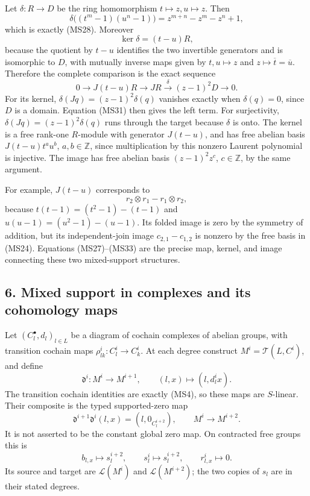 \documentclass[
]{article}
\begin{document}
Let \(\delta:R\to D\) be the ring homomorphism
\(t\mapsto z,u\mapsto z\). Then \[
\delta\bigl((t^m-1)(u^n-1)\bigr)
=z^{m+n}-z^m-z^n+1,
\] which is exactly (MS28). Moreover \[
\ker\delta=(t-u)R,
\tag{MS31}
\] because the quotient by \(t-u\) identifies the two invertible
generators and is isomorphic to \(D\), with mutually inverse maps given
by \(t,u\mapsto z\) and \(z\mapsto\overline t=\overline u\). Therefore
the complete comparison is the exact sequence \[
0\longrightarrow J(t-u)R
\longrightarrow JR
\xrightarrow{\ \delta\ }(z-1)^2D
\longrightarrow0.
\tag{MS32}
\] For its kernel, \(\delta(Jq)=(z-1)^2\delta(q)\) vanishes exactly when
\(\delta(q)=0\), since \(D\) is a domain. Equation (MS31) then gives the
left term. For surjectivity, \(\delta(Jq)=(z-1)^2\delta(q)\) runs
through the target because \(\delta\) is onto. The kernel is a free
rank-one \(R\)-module with generator \(J(t-u)\), and has free abelian
basis \(J(t-u)t^a u^b\), \(a,b\in\mathbb Z\), since multiplication by
this nonzero Laurent polynomial is injective. The image has free abelian
basis \((z-1)^2z^c\), \(c\in\mathbb Z\), by the same argument.

For example, \(J(t-u)\) corresponds to \[
r_2\otimes r_1-r_1\otimes r_2,
\tag{MS33}
\] because \(t(t-1)=(t^2-1)-(t-1)\) and \(u(u-1)=(u^2-1)-(u-1)\). Its
folded image is zero by the symmetry of addition, but its
independent-join image \(c_{2,1}-c_{1,2}\) is nonzero by the free basis
in (MS24). Equations (MS27)--(MS33) are the precise map, kernel, and
image connecting these two mixed-support structures.

\subsection{6. Mixed support in complexes and its cohomology
maps}\label{mixed-support-in-complexes-and-its-cohomology-maps}

Let \((C_l^\bullet,d_l)_{l\in L}\) be a diagram of cochain complexes of
abelian groups, with transition cochain maps
\(\rho_{lk}^i:C_l^i\to C_k^i\). At each degree construct
\(M^i=\mathcal T(L,C^i)\), and define \[
\mathfrak d^i:M^i\to M^{i+1},\qquad(l,x)\longmapsto(l,d_l^i x).
\tag{MS34}
\] The transition cochain identities are exactly (MS4), so these maps
are \(S\)-linear. Their composite is the typed supported-zero map \[
\mathfrak d^{i+1}\mathfrak d^i(l,x)=(l,0_{C_l^{i+2}}),
\qquad M^i\longrightarrow M^{i+2}.
\tag{MS35}
\] It is not asserted to be the constant global zero map. On contracted
free groups this is \[
b_{l,x}\longmapsto s_l^{i+2},\qquad
s_l^i\longmapsto s_l^{i+2},\qquad
r_{l,x}^i\longmapsto0.
\tag{MS36}
\] Its source and target are \(\mathscr L(M^i)\) and
\(\mathscr L(M^{i+2})\); the two copies of \(s_l\) are in their stated
degrees.
\end{document}

